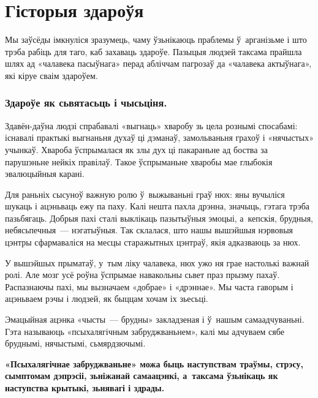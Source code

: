 \section{Гісторыя здароўя}

Мы заўсёды імкнуліся зразумець, чаму ўзьнікаюць праблемы ў~арганізьме і што трэба рабіць для таго, каб захаваць здароўе. Пазыцыя людзей таксама прайшла шлях ад «чалавека пасыўнага» перад абліччам пагрозаў да «чалавека актыўнага», які кіруе сваім здароўем.

\subsubsection{Здароўе як сьвятасьць і чысьціня.}

Здавён-даўна людзі спрабавалі «выгнаць» хваробу зь цела рознымі спосабамі: існавалі практыкі выгнаньня духаў ці дэманаў, замольваньня грахоў і «нячыстых» учынкаў. Хвароба ўспрымалася як злы дух ці пакараньне ад боства за парушэньне нейкіх правілаў. Такое ўспрыманьне хваробы мае глыбокія эвалюцыйныя карані.

Для раньніх сысуноў важную ролю ў~выжываньні граў нюх: яны вучыліся шукаць і ацэньваць ежу па паху. Калі нешта пахла дрэнна, значыць, гэтага трэба пазьбягаць. Добрыя пахі сталі выклікаць пазытыўныя эмоцыі, а~кепскія, брудныя, небясьпечныя~--- нэгатыўныя. Так склалася, што нашы вышэйшыя нэрвовыя цэнтры сфармаваліся на месцы старажытных цэнтраў, якія адказваюць за нюх.

У вышэйшых прыматаў, у~тым ліку чалавека, нюх ужо ня грае настолькі важнай ролі. Але мозг усё роўна ўспрымае навакольны сьвет праз прызму пахаў. Распазнаючы пахі, мы вызначаем «добрае» і «дрэннае». Мы часта гаворым і ацэньваем рэчы і людзей, як быццам хочам іх зьесьці.


Эмацыйная ацэнка «чысты~--- брудны» закладзеная і ў~нашым самаадчуваньні. Гэта называюць «псыхалягічным забруджваньнем», калі мы адчуваем сябе бруднымі, нячыстымі, сьмярдзючымі.

\textbf{«Псыхалягічнае забруджваньне» можа быць наступствам траўмы, стрэсу, сымптомам дэпрэсіі, зьніжанай самаацэнкі, а~таксама ўзьнікаць як наступства крытыкі, зьнявагі і здрады.}

